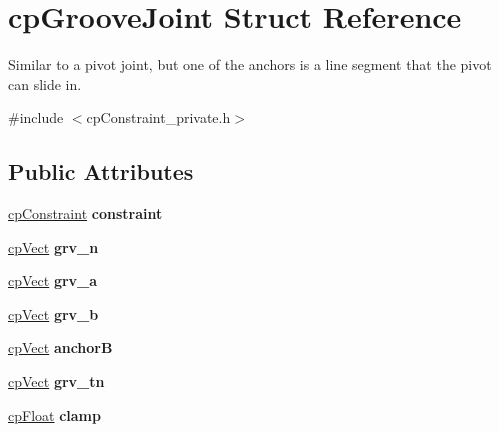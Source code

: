 \hypertarget{structcp_groove_joint}{}\section{cp\+Groove\+Joint Struct Reference}
\label{structcp_groove_joint}


Similar to a pivot joint, but one of the anchors is a line segment that the pivot can slide in.  




{\ttfamily \#include $<$cp\+Constraint\+\_\+private.\+h$>$}

\subsection*{Public Attributes}
\begin{DoxyCompactItemize}
\item 
\hypertarget{structcp_groove_joint_ace538974771b2451ff70e390a45331dd}{}\hyperlink{structcp_constraint}{cp\+Constraint} {\bfseries constraint}\label{structcp_groove_joint_ace538974771b2451ff70e390a45331dd}

\item 
\hypertarget{structcp_groove_joint_aeb76e2ae638c54a139b2c3cfe42d5156}{}\hyperlink{structcp_vect}{cp\+Vect} {\bfseries grv\+\_\+n}\label{structcp_groove_joint_aeb76e2ae638c54a139b2c3cfe42d5156}

\item 
\hypertarget{structcp_groove_joint_af0379447d1b65fac0796bea674c4bcc8}{}\hyperlink{structcp_vect}{cp\+Vect} {\bfseries grv\+\_\+a}\label{structcp_groove_joint_af0379447d1b65fac0796bea674c4bcc8}

\item 
\hypertarget{structcp_groove_joint_a35db57ba915f335aa1d2e7166d717dd7}{}\hyperlink{structcp_vect}{cp\+Vect} {\bfseries grv\+\_\+b}\label{structcp_groove_joint_a35db57ba915f335aa1d2e7166d717dd7}

\item 
\hypertarget{structcp_groove_joint_a3a883b8d3c31700b2269a9a049a82cdc}{}\hyperlink{structcp_vect}{cp\+Vect} {\bfseries anchor\+B}\label{structcp_groove_joint_a3a883b8d3c31700b2269a9a049a82cdc}

\item 
\hypertarget{structcp_groove_joint_a83f1d7191fd95192d586276f6da9e9ac}{}\hyperlink{structcp_vect}{cp\+Vect} {\bfseries grv\+\_\+tn}\label{structcp_groove_joint_a83f1d7191fd95192d586276f6da9e9ac}

\item 
\hypertarget{structcp_groove_joint_ab443f50c8e95df7153215af6ae9699f9}{}\hyperlink{group__basic_types_gac1ed65573e035bf892505768c852d8d3}{cp\+Float} {\bfseries clamp}\label{structcp_groove_joint_ab443f50c8e95df7153215af6ae9699f9}


\end{DoxyCompactItemize}
